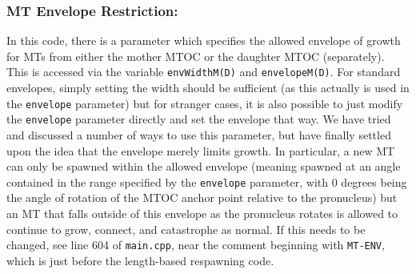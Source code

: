 \documentclass{article}
\begin{document}
\subsubsection{MT Envelope Restriction:}
In this code, there is a parameter which specifies the allowed envelope of
growth for MTs from either the mother MTOC or the daughter MTOC (separately).
This is accessed via the variable \texttt{envWidthM(D)} and
\texttt{envelopeM(D)}. For standard envelopes, simply setting the width should
be sufficient (as this actually is used in the \texttt{envelope} parameter) but
for stranger cases, it is also possible to just modify the \texttt{envelope}
parameter directly and set the envelope that way. We have tried and discussed a
number of ways to use this parameter, but have finally settled upon the idea
that the envelope merely limits growth. In particular, a new MT can only be
spawned within the allowed envelope (meaning spawned at an angle contained in
the range specified by the \texttt{envelope} parameter, with 0 degrees being the
angle of rotation of the MTOC anchor point relative to the pronucleus) but an MT
that falls outside of this envelope as the pronucleus rotates is allowed to
continue to grow, connect, and catastrophe as normal. If this needs to be
changed, see line 604 of \texttt{main.cpp}, near the comment beginning with
\texttt{MT-ENV}, which is just before the length-based respawning code. 
\end{document}
